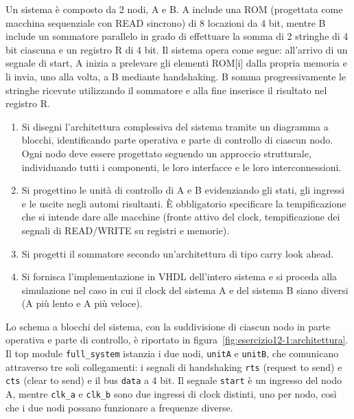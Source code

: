 \label{sec:esercizio12-1}

\begin{traccia}
Un sistema è composto da 2 nodi, A e B. A include una ROM (progettata come macchina sequenziale con READ sincrono) di 8 locazioni da 4 bit, mentre B include un sommatore parallelo in grado di effettuare la somma di 2 stringhe di 4 bit ciascuna e un registro R di 4 bit. Il sistema opera come segue: all'arrivo di un segnale di start, A inizia a prelevare gli elementi ROM[i] dalla propria memoria e li invia, uno alla volta, a B mediante handshaking. B somma progressivamente le stringhe ricevute utilizzando il sommatore e alla fine inserisce il risultato nel registro R.
\begin{enumerate}
  \item Si disegni l'architettura complessiva del sistema tramite un diagramma a blocchi, identificando parte operativa e parte di controllo di ciascun nodo. Ogni nodo deve essere progettato seguendo un approccio strutturale, individuando tutti i componenti, le loro interfacce e le loro interconnessioni.
  \item Si progettino le unità di controllo di A e B evidenziando gli stati, gli ingressi e le uscite negli automi risultanti. È obbligatorio specificare la tempificazione che si intende dare alle macchine (fronte attivo del clock, tempificazione dei segnali di READ/WRITE su registri e memorie).
  \item Si progetti il sommatore secondo un'architettura di tipo carry look ahead.
  \item Si fornisca l'implementazione in VHDL dell'intero sistema e si proceda alla simulazione nel caso in cui il clock del sistema A e del sistema B siano diversi (A più lento e A più veloce).
\end{enumerate}
\end{traccia}


Lo schema a blocchi del sistema, con la suddivisione di ciascun nodo in parte operativa e parte di controllo, è riportato in figura~\ref{fig:esercizio12-1:architettura}. Il top module \texttt{full\_system} istanzia i due nodi, \texttt{unitA} e \texttt{unitB}, che comunicano attraverso tre soli collegamenti: i segnali di handshaking \texttt{rts} (request to send) e \texttt{cts} (clear to send) e il bus \texttt{data} a 4 bit. Il segnale \texttt{start} è un ingresso del nodo A, mentre \texttt{clk\_a} e \texttt{clk\_b} sono due ingressi di clock distinti, uno per nodo, così che i due nodi possano funzionare a frequenze diverse.

